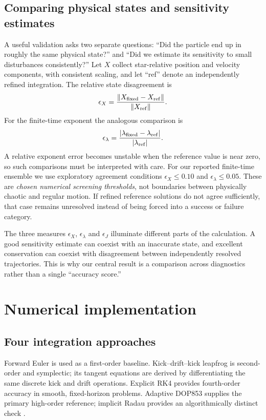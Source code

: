\documentclass[10pt,letterpaper,twocolumn]{article}
\begin{document}
\subsection{Comparing physical states and sensitivity estimates}
A useful validation asks two separate questions: ``Did the particle end up in roughly the same physical state?'' and ``Did we estimate its sensitivity to small disturbances consistently?'' Let $X$ collect star-relative position and velocity components, with consistent scaling, and let ``ref'' denote an independently refined integration. The relative state disagreement is
\begin{equation}\label{eq:stateerror}
 \epsilon_X=\frac{\lVert X_{\rm fixed}-X_{\rm ref}\rVert}
 {\lVert X_{\rm ref}\rVert}.
\end{equation}
For the finite-time exponent the analogous comparison is
\begin{equation}\label{eq:lyaperror}
 \epsilon_\lambda=\frac{|\lambda_{\rm fixed}-\lambda_{\rm ref}|}
 {|\lambda_{\rm ref}|}.
\end{equation}
A relative exponent error becomes unstable when the reference value is near zero, so such comparisons must be interpreted with care. For our reported finite-time ensemble we use exploratory agreement conditions $\epsilon_X\le0.10$ and $\epsilon_\lambda\le0.05$. These are \emph{chosen numerical screening thresholds}, not boundaries between physically chaotic and regular motion. If refined reference solutions do not agree sufficiently, that case remains unresolved instead of being forced into a success or failure category.

The three measures $\epsilon_X$, $\epsilon_\lambda$ and $\epsilon_J$ illuminate different parts of the calculation. A good sensitivity estimate can coexist with an inaccurate state, and excellent conservation can coexist with disagreement between independently resolved trajectories. This is why our central result is a comparison across diagnostics rather than a single ``accuracy score.''

\section{Numerical implementation}
\subsection{Four integration approaches}
Forward Euler is used as a first-order baseline. Kick--drift--kick leapfrog is second-order and symplectic; its tangent equations are derived by differentiating the same discrete kick and drift operations. Explicit RK4 provides fourth-order accuracy in smooth, fixed-horizon problems. Adaptive DOP853 supplies the primary high-order reference; implicit Radau provides an algorithmically distinct check \cite{hairer2006geometric,virtanen2020scipy}.
\end{document}
